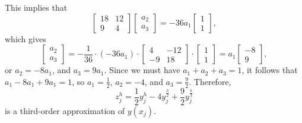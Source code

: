 \documentclass{homework}
\begin{document}
	This implies that
	\begin{equation}
		\left[\begin{matrix}
			18 & 12 \\
			9 & 4
		\end{matrix}\right]\left[\begin{matrix}
		a_2 \\ a_3
		\end{matrix}\right] = -36a_1\left[\begin{matrix}
			1 \\ 1
		\end{matrix}\right],
	\end{equation}
	which gives
	\begin{equation}
		\left[\begin{matrix}
			a_2 \\ a_3
		\end{matrix}\right] = -\frac{1}{36}\cdot (-36a_1)\cdot\left[\begin{matrix}
			4 & -12 \\
			-9 & 18
		\end{matrix}\right]\cdot\left[\begin{matrix}
			1 \\ 1
		\end{matrix}\right] = a_1\left[\begin{matrix}
			-8\\9
		\end{matrix}\right],
	\end{equation}
	or $a_2 = -8 a_1$, and $a_3 = 9a_1$. Since we must have $a_1 + a_2 + a_3 =1$, it follows that $a_1 - 8a_1 + 9a_1 = 1$, so $a_1 = \frac{1}{2}$, $a_2 = -4$, and $a_3 = \frac{9}{2}$. Therefore,
	\begin{equation}
		z_j^h = \frac{1}{2}y_j^h - 4y_j^{\frac{h}{2}} + \frac{9}{2}y_j^\frac{h}{3}
	\end{equation}
	is a third-order approximation of $y(x_j)$.
\end{document}
